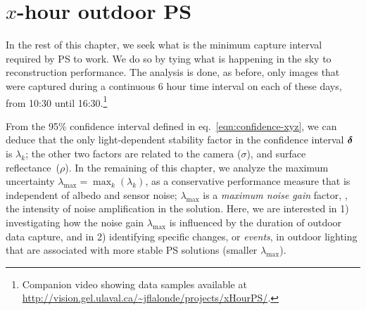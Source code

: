 

\section{$x$-hour outdoor PS}
\label{sec:ch1_analysis}

In the rest of this chapter, we seek what is the minimum capture interval required by PS to work. We do so by tying what is happening in the sky to reconstruction performance. The analysis is done, as before, only images that were captured during a continuous 6 hour time interval on each of these days, from 10:30 until 16:30.\footnote{Companion video showing data samples available at \url{http://vision.gel.ulaval.ca/~jflalonde/projects/xHourPS/}.} 

From the 95\% confidence interval defined in eq.~\eqref{eqn:confidence-xyz}, we can deduce that the only light-dependent stability factor in the confidence interval $\boldsymbol \delta$ is $\lambda_k$; the other two factors are related to the camera ($\sigma$), and surface reflectance~($\rho$). In the remaining of this chapter, we analyze the maximum uncertainty \mbox{$\lambda_\text{max} = \max_k(\lambda_k)$}, as a conservative performance measure that is independent of albedo and sensor noise; $\lambda_\text{max}$ is a {\em maximum noise gain} factor, \ie, the intensity of noise amplification in the solution. Here, we are interested in 1) investigating how the noise gain $\lambda_\text{max}$ is influenced by the duration of outdoor data capture, and in 2) identifying specific changes, or {\em events}, in outdoor lighting that are associated with more stable PS solutions (smaller $\lambda_\text{max}$).

